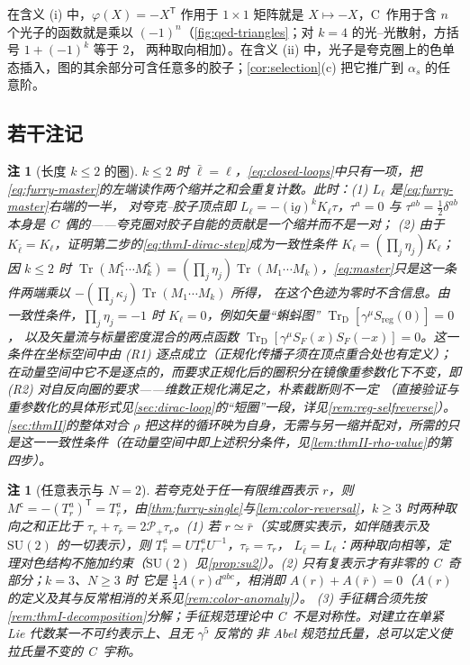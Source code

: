 \documentclass[UTF8,a4paper,11pt,fontset=fandol]{ctexart}
\theoremstyle{cplain}
\theoremstyle{cdefinition}
\theoremstyle{cremark}
\newtheorem{remark}[theorem]{注}
\numberwithin{equation}{section}
\DeclareMathOperator{\Tr}{Tr}
\newcommand{\TrD}{\operatorname{Tr}_{\mathrm{D}}}   %
\newcommand{\tp}{\mathsf{T}}                         %
\newcommand{\Pp}{\mathcal{P}_{+}}                    %
\newcommand{\SF}{S_{F}}                              %
\newcommand{\ii}{\mathrm{i}}                        %
\begin{document}
在含义 (i) 中，$\varphi(X)=-X^{\tp}$ 作用于 $1\times1$ 矩阵就是 $X\mapsto-X$，C~作用于含 $n$ 个光子的函数就是乘以 $(-1)^n$（\cref{fig:qed-triangles}；对 $k=4$ 的光--光散射，方括号 $1+(-1)^k$ 等于 $2$，
两种取向相加）。在含义 (ii) 中，光子是夸克圈上的色单态插入，图的其余部分可含任意多的胶子；\cref{cor:selection}(c) 把它推广到 $\alpha_s$ 的任意阶。

\subsection{若干注记}\label{sec:thmI-remarks}

\begin{remark}[长度 $k\le2$ 的圈]\label{rem:thmI-short-loops}
$k\le2$ 时 $\bar\ell=\ell$，\cref{eq:closed-loops}中只有一项，把\cref{eq:furry-master}的左端读作两个缩并之和会重复计数。此时：(1) $L_\ell$ 是\cref{eq:furry-master}右端的一半，
对夸克--胶子顶点即 $L_\ell=-(\ii g)^kK_\ell\tau$，$\tau^a=0$ 与 $\tau^{ab}=\frac12\delta^{ab}$ 本身是 C~偶的——夸克圈对胶子自能的贡献是\emph{一个}缩并而不是一对；
(2) 由于 $K_{\bar\ell}=K_\ell$，证明第二步的\cref{eq:thmI-dirac-step}成为一致性条件 $K_\ell=(\prod_j\eta_j)K_\ell$；
因 $k\le2$ 时 $\Tr(M_1^{\mathsf c}\cdots M_k^{\mathsf c})=(\prod_j\eta_j)\Tr(M_1\cdots M_k)$，\cref{eq:master}只是这一条件两端乘以 $-(\prod_j\kappa_j)\Tr(M_1\cdots M_k)$ 所得，
在这个色迹为零时不含信息。由一致性条件，$\prod_j\eta_j=-1$ 时 $K_\ell=0$，例如矢量“蝌蚪图” $\TrD[\gamma^\mu S_{\mathrm{reg}}(0)]=0$，
以及矢量流与标量密度混合的两点函数 $\TrD[\gamma^\mu\SF(x)\SF(-x)]=0$。这一条件在坐标空间中由 (R1) 逐点成立（正规化传播子须在顶点重合处也有定义）；
在动量空间中它不是逐点的，而要求正规化后的圈积分在镜像重参数化下不变，即 (R2) 对自反向圈的要求——维数正规化满足之，朴素截断则不一定
（直接验证与重参数化的具体形式见\cref{sec:dirac-loop}的“短圈”一段，详见\cref{rem:reg-selfreverse}）。\cref{sec:thmII}的整体对合
$\rho$ 把这样的循环映为自身，无需与另一缩并配对，所需的只是这一一致性条件（在动量空间中即上述积分条件，见\cref{lem:thmII-rho-value}的第四步）。
\end{remark}

\begin{remark}[任意表示与 $N=2$]\label{rem:thmI-rep}
若夸克处于任一有限维酉表示 $r$，则 $M^{\mathsf c}=-(T^a_r)^{\tp}=T^a_{\bar r}$，由\cref{thm:furry-single}与\cref{lem:color-reversal}，$k\ge3$ 时两种取向之和正比于
$\tau_r+\tau_{\bar r}=2\Pp\tau_r$。(1) 若 $r\simeq\bar r$（实或赝实表示，如伴随表示及 $\mathrm{SU}(2)$ 的一切表示），则 $T^a_{\bar r}=UT^a_rU^{-1}$，$\tau_{\bar r}=\tau_r$，
$L_{\bar\ell}=L_\ell$：两种取向相等，定理对色结构不施加约束（$\mathrm{SU}(2)$ 见\cref{prop:su2}）。(2) 只有复表示才有非零的 C~奇部分；$k=3$、$N\ge3$ 时
它是 $\frac14A(r)d^{abc}$，相消即 $A(r)+A(\bar r)=0$（$A(r)$ 的定义及其与反常相消的关系见\cref{rem:color-anomaly}）。
(3) 手征耦合须先按\cref{rem:thmI-decomposition}分解；手征规范理论中 C~不是对称性。对建立在单紧 Lie 代数某一不可约表示上、且无 $\gamma^5$ 反常的
非 Abel 规范拉氏量，总可以定义使拉氏量不变的 C~宇称\cite{Smolyakov1982}。
\end{remark}
\end{document}
